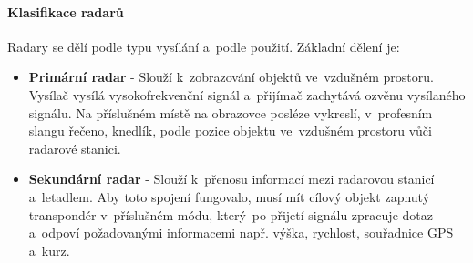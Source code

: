 	\paragraph{Klasifikace radarů}
			Radary se dělí podle typu vysílání a~podle použití\cite{radarClasification}. Základní dělení je: 
			\begin{itemize}
				\item \textbf{Primární radar}	-	Slouží k~zobrazování objektů ve~vzdušném prostoru. Vysílač vysílá vysokofrekvenční signál a~přijímač zachytává ozvěnu vysílaného signálu. Na příslušném místě na obrazovce posléze vykreslí, v~profesním slangu řečeno, knedlík, podle pozice objektu ve~vzdušném prostoru vůči radarové stanici.
					
				\item \textbf{Sekundární radar}	-	Slouží k~přenosu informací mezi radarovou stanicí a~letadlem. Aby toto spojení fungovalo, musí mít cílový objekt zapnutý transpondér v~příslušném módu, který~po přijetí signálu zpracuje dotaz a~odpoví požadovanými informacemi např. výška, rychlost, souřadnice GPS a~kurz. 
			\end{itemize}
			
